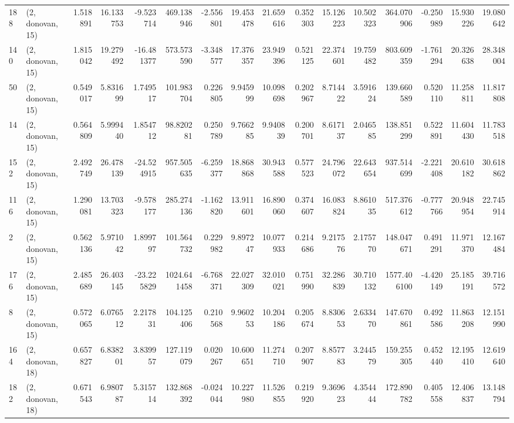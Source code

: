 \begin{tabular}{llrrrrrrrrrrrrrr}
188 &  (2, donovan, 15) &   1.518891 &  16.133753 &  -9.523714 &   469.138946 &  -2.556801 &  19.453478 &  21.659616 &  0.352303 &  15.126223 &  10.502323 &   364.070906 & -0.250989 &  15.930226 &  19.080642 \\
140 &  (2, donovan, 15) &   1.815042 &  19.279492 & -16.481377 &   573.573590 &  -3.348577 &  17.376357 &  23.949396 &  0.521125 &  22.374601 &  19.759482 &   803.609359 & -1.761294 &  20.326638 &  28.348004 \\
50  &  (2, donovan, 15) &   0.549017 &   5.831699 &   1.749517 &   101.983704 &   0.226805 &   9.945999 &  10.098698 &  0.202967 &   8.714422 &   3.591624 &   139.660589 &  0.520110 &  11.258811 &  11.817808 \\
14  &  (2, donovan, 15) &   0.564809 &   5.999440 &   1.854712 &    98.820281 &   0.250789 &   9.766285 &   9.940839 &  0.200701 &   8.617137 &   2.046585 &   138.851299 &  0.522891 &  11.604430 &  11.783518 \\
152 &  (2, donovan, 15) &   2.492749 &  26.478139 & -24.524915 &   957.505635 &  -6.259377 &  18.868868 &  30.943588 &  0.577523 &  24.796072 &  22.643654 &   937.514699 & -2.221408 &  20.610182 &  30.618862 \\
116 &  (2, donovan, 15) &   1.290081 &  13.703323 &  -9.578177 &   285.274136 &  -1.162820 &  13.911601 &  16.890060 &  0.374607 &  16.083824 &   8.861035 &   517.376612 & -0.777766 &  20.948954 &  22.745914 \\
2   &  (2, donovan, 15) &   0.562136 &   5.971042 &   1.899797 &   101.564732 &   0.229982 &   9.897247 &  10.077933 &  0.214686 &   9.217576 &   2.175770 &   148.047671 &  0.491291 &  11.971370 &  12.167484 \\
176 &  (2, donovan, 15) &   2.485689 &  26.403145 & -23.225829 &  1024.641458 &  -6.768371 &  22.027309 &  32.010021 &  0.751990 &  32.286839 &  30.710132 &  1577.406100 & -4.420149 &  25.185191 &  39.716572 \\
8   &  (2, donovan, 15) &   0.572065 &   6.076512 &   2.217831 &   104.125406 &   0.210568 &   9.960253 &  10.204186 &  0.205674 &   8.830653 &   2.633470 &   147.670861 &  0.492586 &  11.863208 &  12.151990 \\
164 &  (2, donovan, 18) &   0.657827 &   6.838201 &   3.839957 &   127.119079 &   0.020267 &  10.600651 &  11.274710 &  0.207907 &   8.857783 &   3.244579 &   159.255305 &  0.452440 &  12.195410 &  12.619640 \\
182 &  (2, donovan, 18) &   0.671543 &   6.980787 &   5.315714 &   132.868392 &  -0.024044 &  10.227980 &  11.526855 &  0.219920 &   9.369623 &   4.354444 &   172.890782 &  0.405558 &  12.406837 &  13.148794 \\

\end{tabular}
